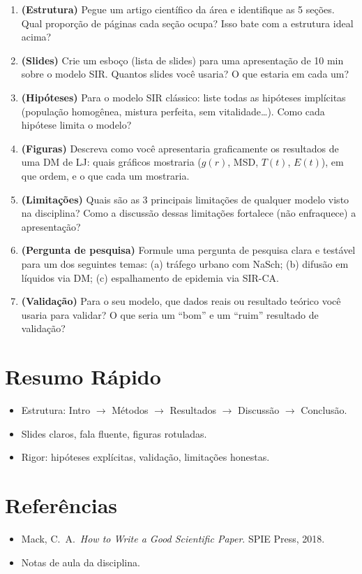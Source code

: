 \documentclass[12pt,a4paper]{article}
\begin{document}
\begin{enumerate}
  \item \textbf{(Estrutura)} Pegue um artigo cient\'ifico da \'area e identifique as 5 se\c{c}\~oes. Qual propor\c{c}\~ao de p\'aginas cada se\c{c}\~ao ocupa? Isso bate com a estrutura ideal acima?
  
  \item \textbf{(Slides)} Crie um esbo\c{c}o (lista de slides) para uma apresenta\c{c}\~ao de 10 min sobre o modelo SIR. Quantos slides voc\^e usaria? O que estaria em cada um?
  
  \item \textbf{(Hip\'oteses)} Para o modelo SIR cl\'assico: liste todas as hip\'oteses impl\'icitas (popula\c{c}\~ao homog\^enea, mistura perfeita, sem vitalidade\ldots). Como cada hip\'otese limita o modelo?
  
  \item \textbf{(Figuras)} Descreva como voc\^e apresentaria graficamente os resultados de uma DM de LJ: quais gr\'aficos mostraria ($g(r)$, MSD, $T(t)$, $E(t)$), em que ordem, e o que cada um mostraria.
  
  \item \textbf{(Limita\c{c}\~oes)} Quais s\~ao as 3 principais limita\c{c}\~oes de qualquer modelo visto na disciplina? Como a discuss\~ao dessas limita\c{c}\~oes fortalece (n\~ao enfraquece) a apresenta\c{c}\~ao?
  
  \item \textbf{(Pergunta de pesquisa)} Formule uma pergunta de pesquisa clara e test\'avel para um dos seguintes temas: (a) tr\'afego urbano com NaSch; (b) difus\~ao em l\'iquidos via DM; (c) espalhamento de epidemia via SIR-CA.
  
  \item \textbf{(Valida\c{c}\~ao)} Para o seu modelo, que dados reais ou resultado te\'orico voc\^e usaria para validar? O que seria um ``bom'' e um ``ruim'' resultado de valida\c{c}\~ao?
\end{enumerate}

\section*{Resumo R\'apido}
\begin{itemize}
  \item Estrutura: Intro $\to$ M\'etodos $\to$ Resultados $\to$ Discuss\~ao $\to$ Conclus\~ao.
  \item Slides claros, fala fluente, figuras rotuladas.
  \item Rigor: hip\'oteses expl\'icitas, valida\c{c}\~ao, limita\c{c}\~oes honestas.
\end{itemize}

\section*{Refer\^encias}
\begin{itemize}
  \item Mack, C.\ A.\ \textit{How to Write a Good Scientific Paper}. SPIE Press, 2018.
  \item Notas de aula da disciplina.
\end{itemize}
\end{document}
